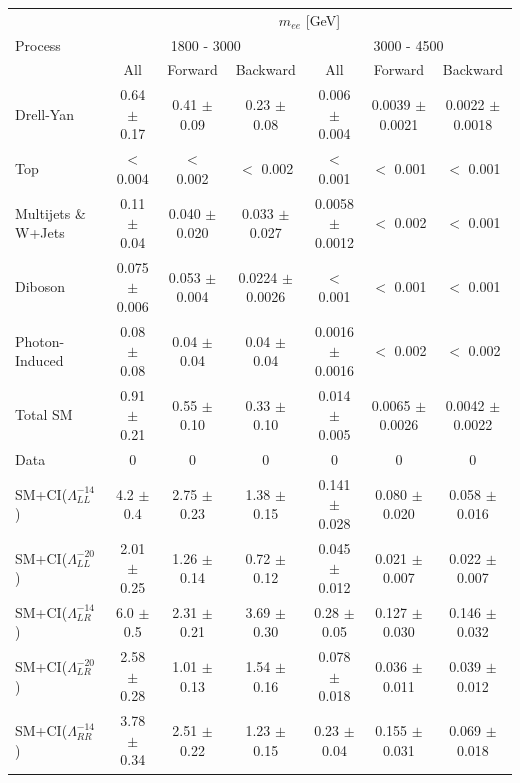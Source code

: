 	\begin {table}[h]
		\footnotesize 
		\begin{center}
		\begin{tabular}{  l | c c c | c c c  }
			\hline
			\hline
			\multirow{3}{*}{Process} 	& \multicolumn{6}{c}{$m_{ee}$ [GeV]} \\
										& \multicolumn{3}{c}{1800 - 3000} & \multicolumn{3}{c}{3000 - 4500} \\
										\cline{2-7}
										& All & Forward & Backward & All & Forward & Backward \\
			\hline
			Drell-Yan & 0.64 $\pm$ 0.17 & 0.41 $\pm$ 0.09 & 0.23 $\pm$ 0.08 & 0.006 $\pm$ 0.004 & 0.0039 $\pm$ 0.0021 & 0.0022 $\pm$ 0.0018 \\
			Top & $<$ 0.004   & $<$ 0.002   & $<$ 0.002   & $<$ 0.001   & $<$ 0.001   & $<$ 0.001   \\
			Multijets \& W+Jets & 0.11 $\pm$ 0.04 & 0.040 $\pm$ 0.020 & 0.033 $\pm$ 0.027 & 0.0058 $\pm$ 0.0012 & $<$ 0.002   & $<$ 0.001   \\
			Diboson & 0.075 $\pm$ 0.006 & 0.053 $\pm$ 0.004 & 0.0224 $\pm$ 0.0026 & $<$ 0.001   & $<$ 0.001   & $<$ 0.001   \\
			Photon-Induced & 0.08 $\pm$ 0.08 & 0.04 $\pm$ 0.04 & 0.04 $\pm$ 0.04 & 0.0016 $\pm$ 0.0016 & $<$ 0.002   & $<$ 0.002   \\
			\hline
			Total SM & 0.91 $\pm$ 0.21 & 0.55 $\pm$ 0.10 & 0.33 $\pm$ 0.10 & 0.014 $\pm$ 0.005 & 0.0065 $\pm$ 0.0026 & 0.0042 $\pm$ 0.0022 \\
			\hline
			Data & 0 & 0 & 0 & 0 & 0 & 0 \\
			\hline
			SM+CI($\Lambda^{-14}_{LL}$) & 4.2 $\pm$ 0.4 & 2.75 $\pm$ 0.23 & 1.38 $\pm$ 0.15 & 0.141 $\pm$ 0.028 & 0.080 $\pm$ 0.020 & 0.058 $\pm$ 0.016 \\
			SM+CI($\Lambda^{-20}_{LL}$) & 2.01 $\pm$ 0.25 & 1.26 $\pm$ 0.14 & 0.72 $\pm$ 0.12 & 0.045 $\pm$ 0.012 & 0.021 $\pm$ 0.007 & 0.022 $\pm$ 0.007 \\
			SM+CI($\Lambda^{-14}_{LR}$) & 6.0 $\pm$ 0.5 & 2.31 $\pm$ 0.21 & 3.69 $\pm$ 0.30 & 0.28 $\pm$ 0.05 & 0.127 $\pm$ 0.030 & 0.146 $\pm$ 0.032 \\
			SM+CI($\Lambda^{-20}_{LR}$) & 2.58 $\pm$ 0.28 & 1.01 $\pm$ 0.13 & 1.54 $\pm$ 0.16 & 0.078 $\pm$ 0.018 & 0.036 $\pm$ 0.011 & 0.039 $\pm$ 0.012 \\
			SM+CI($\Lambda^{-14}_{RR}$) & 3.78 $\pm$ 0.34 & 2.51 $\pm$ 0.22 & 1.23 $\pm$ 0.15 & 0.23 $\pm$ 0.04 & 0.155 $\pm$ 0.031 & 0.069 $\pm$ 0.018 \\

\end{tabular}
\end{center}
\end{table}

